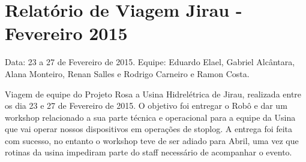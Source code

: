 \section{Relatório de Viagem Jirau - Fevereiro 2015}
Data: 23 a 27 de Fevereiro de 2015.
Equipe: Eduardo Elael, Gabriel Alcântara, Alana Monteiro, Renan Salles e Rodrigo Carneiro e Ramon Costa.


Viagem de equipe do Projeto Rosa a Usina Hidrelétrica de Jirau, realizada entre
os dia 23 e 27 de Fevereiro de 2015. O objetivo foi entregar o Robô e dar um
workshop relacionado a sua parte técnica e operacional para a equipe da Usina
que vai operar nossos dispositivos em operações de stoplog. A entrega foi feita
com sucesso, no entanto o workshop teve de ser adiado para Abril, uma vez que
rotinas da usina impediram parte do staff necessário de acompanhar o evento.
